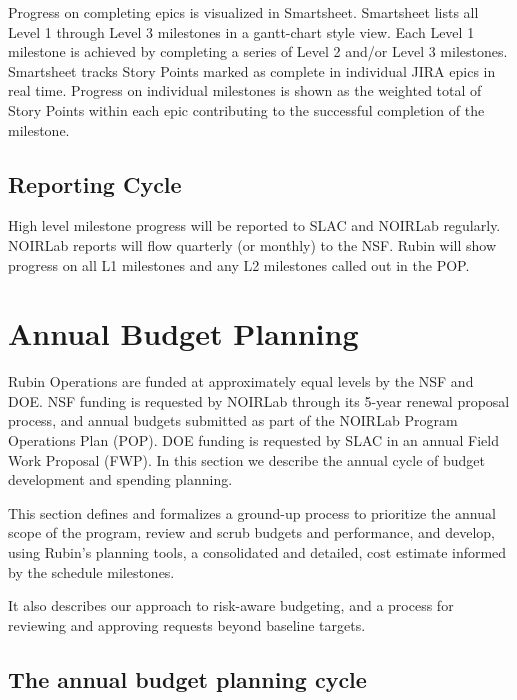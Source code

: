 Progress on completing epics is visualized in Smartsheet.
Smartsheet lists all Level 1 through Level 3 milestones in a gantt-chart style view.
Each Level 1 milestone is achieved by completing a series of Level 2 and/or Level 3 milestones.
Smartsheet tracks Story Points marked as complete in individual \gls{JIRA} epics in real time.
Progress on individual milestones is shown as the weighted total of Story Points within each \gls{epic} contributing to the successful completion of the milestone.

\subsection{Reporting Cycle}

High level milestone progress will be reported to \gls{SLAC} and \gls{NOIRLab} regularly.
NOIRLab reports will flow quarterly (or monthly) to the \gls{NSF}.
Rubin will show progress on all \gls{L1} milestones and any \gls{L2} milestones called out in the \gls{POP}.

\section{Annual Budget Planning}
\label{sec:annual-cycle}

Rubin Operations are funded at approximately equal levels by the NSF and DOE. NSF funding is requested by \gls{NOIRLab} through its 5-year renewal proposal process, and annual budgets submitted as part of the \gls{NOIRLab} Program Operations Plan (\gls{POP}). DOE funding is requested by \gls{SLAC} in an annual Field Work Proposal (FWP). In this section we describe the annual cycle of budget development and spending planning.

This section defines and formalizes a ground-up process to
prioritize the annual scope of the program,
review and scrub budgets and performance,
and develop, using Rubin's planning tools, a consolidated and detailed, cost estimate informed by the schedule milestones.

It also describes our approach to risk-aware budgeting, and a process for reviewing and approving requests beyond baseline targets.


\subsection{The annual budget planning \gls{cycle}}

